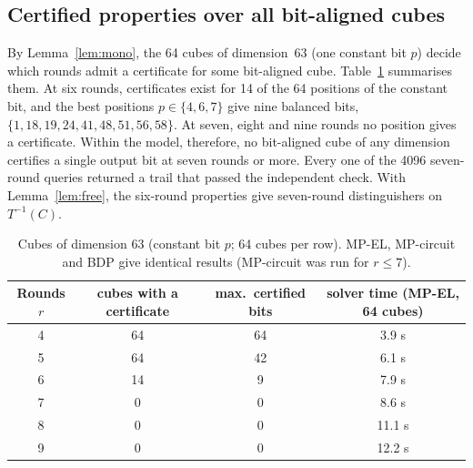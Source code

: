 \documentclass[11pt,a4paper]{article}
\theoremstyle{definition}
\theoremstyle{remark}
\newcommand{\MPEL}{\textsf{MP-EL}}
\newcommand{\MPC}{\textsf{MP-circuit}}
\newcommand{\BDP}{\textsf{BDP}}
\begin{document}
\subsection{Certified properties over all bit-aligned cubes}
By Lemma~\ref{lem:mono}, the 64 cubes of dimension~63 (one constant bit $p$) decide which rounds admit a certificate for some bit-aligned cube. Table~\ref{tab:maximal} summarises them. At six rounds, certificates exist for 14 of the 64 positions of the constant bit, and the best positions $p\in\{4,6,7\}$ give nine balanced bits, $\{1,18,19,24,41,48,51,56,58\}$. At seven, eight and nine rounds no position gives a certificate. Within the model, therefore, no bit-aligned cube of any dimension certifies a single output bit at seven rounds or more. Every one of the 4096 seven-round queries returned a trail that passed the independent check. With Lemma~\ref{lem:free}, the six-round properties give seven-round distinguishers on $T^{-1}(C)$.

\begin{table}[t]\centering
\caption{Cubes of dimension 63 (constant bit $p$; 64 cubes per row). \MPEL, \MPC{} and \BDP{} give identical results (\MPC{} was run for $r\le7$).}\label{tab:maximal}
\begin{tabular}{cccc}
\toprule
Rounds $r$ & cubes with a certificate & max.\ certified bits & solver time (\MPEL, 64 cubes) \\
\midrule
4 & 64 & 64 & 3.9 s\\
5 & 64 & 42 & 6.1 s\\
6 & 14 & 9  & 7.9 s\\
7 & 0  & 0  & 8.6 s\\
8 & 0  & 0  & 11.1 s\\
9 & 0  & 0  & 12.2 s\\
\bottomrule
\end{tabular}
\end{table}
\end{document}
